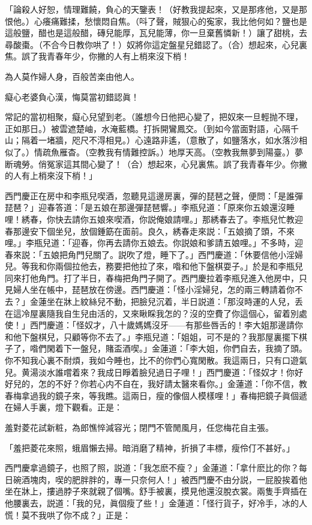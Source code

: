 「論殺人好恕，情理難饒，負心的天鑒表！（好教我提起來，又是那疼他，又是那恨他。）心癢痛難揉，愁懷悶自焦。（呌了聲，賊狠心的寃家，我比他何如？鹽也是這般鹽，醋也是這般醋，磚兒能厚，瓦兒能薄，你一旦棄舊憐新！）讓了甜桃，去尋酸棗。（不合今日教你哄了！）奴將你這定盤星兒錯認了。（合）想起來，心兒裏焦。誤了我青春年少，你撇的人有上梢來沒下梢！　

為人莫作婦人身，百般苦楽由他人。

癡心老婆負心漢，悔莫當初錯認眞！

常記的當初相聚，癡心兒望到老。（誰想今日他把心變了，把奴來一旦輕抛不理，正如那日。）被雲遮楚岫，水淹藍橋。打拆開鸞鳳交。（到如今當面對語，心隔千山；隔着一堵牆，咫尺不淂相見。）心遠路非遙，（意散了，如鹽落水，如水落沙相似了。）情疏魚雁杳。（空教我有情難控訴。）地厚天高。（空教我無夢到陽臺。）夢断魂勞。俏冤家這其間心變了！（合）想起來，心兒裏焦。誤了我青春年少。你撇的人有上梢來沒下梢！」

西門慶正在房中和李瓶兒喫酒，忽聽見這邊房裏，彈的琵琶之聲，便問：「是誰彈琵琶？」迎春答道：「是五娘在那邊彈琵琶響。」李瓶兒道：「原來你五娘還沒睡哩！綉春，你快去請你五娘來喫酒，你説俺娘請哩。」那綉春去了。李瓶兒忙教迎春那邊安下個坐兒，放個鍾筯在面前。良久，綉春走來説：「五娘摘了頭，不來哩。」李瓶兒道：「迎春，你再去請你五娘去。你説娘和爹請五娘哩。」不多時，迎春來説：「五娘把角門兒關了。説吹了燈，睡下了。」西門慶道：「休要信他小淫婦兒。等我和你兩個拉他去，務要把他拉了來，喒和他下盤棋耍子。」於是和李瓶兒同來打他角門。打了半日，春梅把角門子開了。西門慶拉着李瓶兒進入他房中，只見婦人坐在帳中，琵琶放在傍邊。西門慶道：「怪小淫婦兒，怎的兩三轉請着你不去？」金蓮坐在牀上紋絲兒不動，把臉兒沉着，半日説道：「那沒時運的人兒，丢在這冷屋裏隨我自生兒由活的，又來瞅睬我怎的？沒的空費了你這個心，留着別處使！」西門慶道：「怪奴才，八十歲媽媽沒牙——有那些唇舌的！李大姐那邊請你和他下盤棋兒，只顧等你不去了。」李瓶兒道：「姐姐，可不是的？我那屋裏擺下棋子了，喒們閑着下一盤兒，賭盃酒喫。」金蓮道：「李大姐，你們自去，我摘了頭。你不知我心裏不耐煩，我如今睡也，比不的你們心寬閑散。我這兩日，只有口遊氣兒。黄湯淡水誰嚐着來？我成日睜着臉兒過日子哩！」西門慶道：「怪奴才！你好好兒的，怎的不好？你若心内不自在，我好請太醫來看你。」金蓮道：「你不信，教春梅拿過我的鏡子來，等我瞧。這兩日，瘦的像個人模樣哩！」春梅把鏡子眞個遞在婦人手裏，燈下觀看。正是：

羞對菱花試新粧，為郎憔悴減容光；閉門不管閒風月，任您梅花自主張。

「羞把菱花來照，蛾眉懶去掃。暗消磨了精神，折損了丰標，瘦伶仃不甚好。」

西門慶拿過鏡子，也照了照，説道：「我怎麽不瘦？」金蓮道：「拿什麽比的你？每日碗酒塊肉，喫的肥胖胖的，專一只奈何人！」被西門慶不由分説，一屁股挨着他坐在牀上，摟過脖子來就親了個嘴。舒手被裏，摸見他還沒脫衣裳。兩隻手齊插在他腰裏去，説道：「我的兒，眞個瘦了些！」金蓮道：「怪行貨子，好冷手，冰的人慌！莫不我哄了你不成？」正是：

